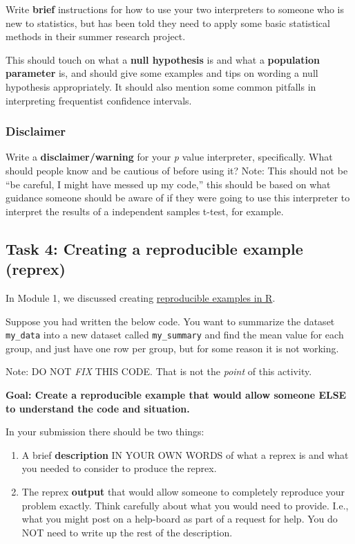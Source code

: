 \documentclass[
  openany]{book}
\providecommand{\tightlist}{%
  \setlength{\itemsep}{0pt}\setlength{\parskip}{0pt}}
\begin{document}
Write \textbf{brief} instructions for how to use your two interpreters to someone who is new to statistics, but has been told they need to apply some basic statistical methods in their summer research project.

This should touch on what a \textbf{null hypothesis} is and what a \textbf{population parameter} is, and should give some examples and tips on wording a null hypothesis appropriately. It should also mention some common pitfalls in interpreting frequentist confidence intervals.

\hypertarget{disclaimer}{%
\subsubsection{Disclaimer}\label{disclaimer}}

Write a \textbf{disclaimer/warning} for your \emph{p} value interpreter, specifically. What should people know and be cautious of before using it? Note: This should not be ``be careful, I might have messed up my code,'' this should be based on what guidance someone should be aware of if they were going to use this interpreter to interpret the results of a independent samples t-test, for example.

\newpage

\hypertarget{task-4-creating-a-reproducible-example-reprex}{%
\subsection{Task 4: Creating a reproducible example (reprex)}\label{task-4-creating-a-reproducible-example-reprex}}

In Module 1, we discussed creating \href{https://sta303-bolton.github.io/sta303-w22-courseguide/m1.html\#reproducible-examples-reprex}{reproducible examples in R}.

Suppose you had written the below code. You want to summarize the dataset \texttt{my\_data} into a new dataset called \texttt{my\_summary} and find the mean value for each group, and just have one row per group, but for some reason it is not working.

Note: DO NOT \emph{FIX} THIS CODE. That is not the \emph{point} of this activity.

\textbf{Goal: Create a reproducible example that would allow someone ELSE to understand the code and situation.}

In your submission there should be two things:

\begin{enumerate}
\def\labelenumi{\arabic{enumi}.}
\tightlist
\item
  A brief \textbf{description} IN YOUR OWN WORDS of what a reprex is and what you needed to consider to produce the reprex.
\item
  The reprex \textbf{output} that would allow someone to completely reproduce your problem exactly. Think carefully about what you would need to provide. I.e., what you might post on a help-board as part of a request for help. You do NOT need to write up the rest of the description.
\end{enumerate}
\end{document}
